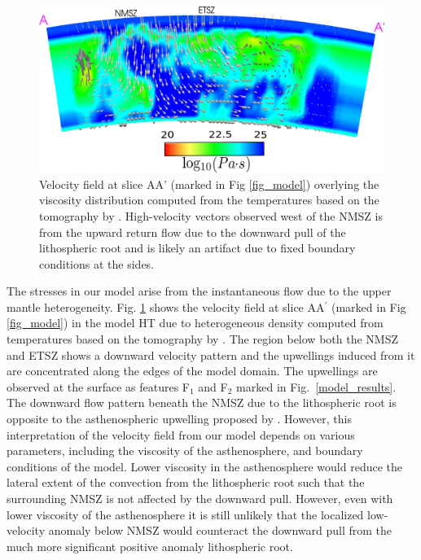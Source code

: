 \documentclass[draft,linenumbers]{agujournal2018}
\begin{document}
\begin{figure}[ht]
    \centering
    \includegraphics[width=0.9\linewidth]{figures/velocity_pattern.png}
    \caption{Velocity field at slice AA' (marked in Fig \ref{fig_model}) overlying the viscosity distribution computed from the temperatures based on the tomography by \citet{Biryol_2016}. High-velocity vectors observed west of the NMSZ is from the upward return flow due to the downward pull of the lithospheric root and is likely an artifact due to fixed boundary conditions at the sides.}
    \label{velocity_pattern}
\end{figure}

    The stresses in our model arise from the instantaneous flow due to the upper mantle heterogeneity. Fig. \ref{velocity_pattern} shows the velocity field at slice AA$^{\prime}$ (marked in Fig \ref{fig_model}) in the model HT due to heterogeneous density computed from temperatures based on the tomography by \citet{Biryol_2016}. The region below both the NMSZ and ETSZ shows a downward velocity pattern and the upwellings induced from it are concentrated along the edges of the model domain. The upwellings are observed at the surface as features F$_1$ and F$_2$ marked in Fig.~\ref{model_results}. The downward flow pattern beneath the NMSZ due to the lithospheric root is opposite to the asthenospheric upwelling proposed by \citet{Biryol_2016}. However, this interpretation of the velocity field from our model depends on various parameters, including the viscosity of the asthenosphere, and boundary conditions of the model. %
    Lower viscosity in the asthenosphere would reduce the lateral extent of the convection from the lithospheric root such that the surrounding NMSZ is not affected by the downward pull. However, even with lower viscosity of the asthenosphere it is still unlikely that the localized low-velocity anomaly below NMSZ would counteract the downward pull from the much more significant positive anomaly lithospheric root. 
%    
\end{document}

